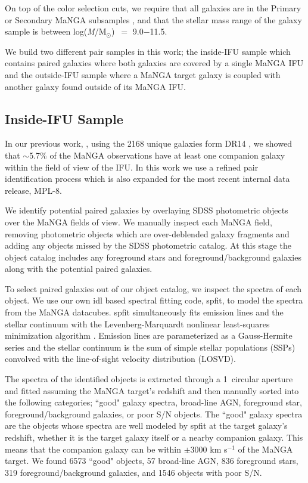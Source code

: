 \documentclass[iop,revtex4,twocolumn,apj,numberedappendix,appendixfloats]{emulateapj}
\newcommand{\logm}{log({\it M}/M$_{\odot}$)}
\begin{document}
On top of the color selection cuts, we require that all galaxies are in the Primary or Secondary MaNGA subsamples \citep{Wake:2017}, and that the stellar mass range of the galaxy sample is between \logm\ $=$ 9.0$-$11.5.

We build two different pair samples in this work; the inside-IFU sample which contains paired galaxies where both galaxies are covered by a single MaNGA IFU and the outside-IFU sample where a MaNGA target galaxy is coupled with another galaxy found outside of its MaNGA IFU. 

\subsection{Inside-IFU Sample}\label{sec:inside}

In our previous work, \citet{Fu:2018}, using the 2168 unique galaxies form DR14 \citep{Abolfathi:2018}, we showed that $\sim$5.7\% of the MaNGA observations have at least one companion galaxy within the field of view of the IFU. In this work we use a refined pair identification process which is also expanded for the most recent internal data release, MPL-8.

We identify potential paired galaxies by overlaying SDSS photometric objects over the MaNGA fields of view. We manually inspect each MaNGA field, removing photometric objects which are over-deblended galaxy fragments and adding any objects missed by the SDSS photometric catalog. At this stage the object catalog includes any foreground stars and foreground/background galaxies along with the potential paired galaxies. 

To select paired galaxies out of our object catalog, we inspect the spectra of each object. We use our own {\sc idl} based spectral fitting code, {\sc spfit}, to model the spectra from the MaNGA datacubes. {\sc spfit} simultaneously fits emission lines and the stellar continuum with the Levenberg-Marquardt nonlinear least-squares minimization algorithm \citep{Fu:2018}. Emission lines are parameterized as a Gauss-Hermite series and the stellar continuum is the sum of simple stellar populations (SSPs) convolved with the line-of-sight velocity distribution (LOSVD).

The spectra of the identified objects is extracted through a 1\arcsec\ circular aperture and fitted assuming the MaNGA target's redshift and then manually sorted into the following categories; ``good" galaxy spectra, broad-line AGN, foreground star, foreground/background galaxies, or poor S/N objects. The ``good" galaxy spectra are the objects whose spectra are well modeled by {\sc spfit} at the target galaxy's redshift, whether it is the target galaxy itself or a nearby companion galaxy. This means that the companion galaxy can be within $\pm$3000 km s$^{-1}$ of the MaNGA target. We found 6573 ``good" objects, 57 broad-line AGN, 836 foreground stars, 319 foreground/background galaxies, and 1546 objects with poor S/N. 
\end{document}
